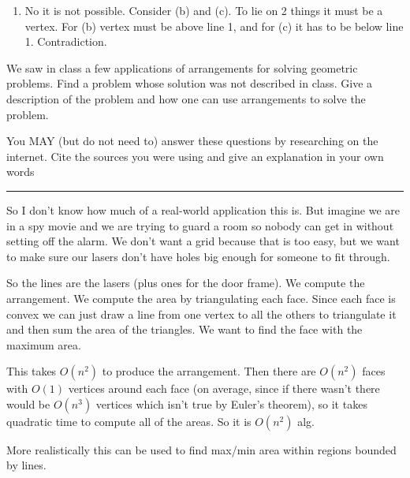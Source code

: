 \documentclass[11pt]{article}
\begin{document}
\begin{enumerate}
\begin{enumerate}
    \end{enumerate}

    \item No it is not possible. Consider (b) and (c). To lie on 2 things it must be a vertex.
    For (b) vertex must be above line 1, and for (c) it has to be below line 1. Contradiction.
\end{enumerate}









We saw in class a few applications of arrangements for solving geometric
problems. Find a problem whose solution was not described in class.  Give a
description of the problem and how one can use arrangements to solve the
problem.

You MAY (but do not need to) answer these questions by researching on the
internet. Cite the sources you were using and give an explanation in your own
words

\hrule


So I don't know how much of a real-world application this is. But imagine we are in a spy movie
and we are trying to guard a room so nobody can get in without setting off the alarm. 
We don't want a grid because that is too easy, but we want to make sure our lasers
don't have holes big enough for someone to fit through. 

So the lines are the lasers (plus ones for the door frame). We compute the arrangement. We compute the area by triangulating each face.
Since each face is convex we can just draw a line from one vertex to all the others to triangulate it
and then sum the area of the triangles. We want to find the face with the maximum area. 

This takes $O(n^2)$ to produce the arrangement. Then there are $O(n^2)$ faces with $O(1)$ vertices
around each face (on average, since if there wasn't there would be $O(n^3)$ vertices which isn't true by Euler's theorem),
so it takes quadratic time to compute all of the areas. So it is $O(n^2)$ alg.

More realistically this can be used to find max/min area within regions bounded by lines. 
\end{document}
